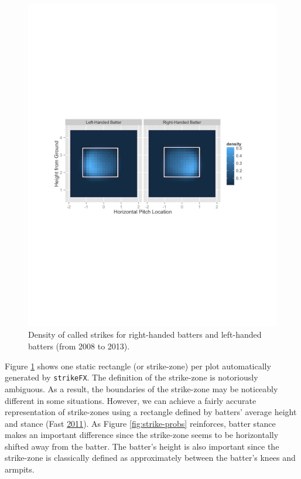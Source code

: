 \documentclass[12pt,]{isuthesis}
\begin{document}
\begin{figure}[htbp]
\centering
\includegraphics{images/strikes.pdf}
\caption{\label{fig:STRIKES}Density of called strikes for right-handed
batters and left-handed batters (from 2008 to 2013).}
\end{figure}

Figure \ref{fig:STRIKES} shows one static rectangle (or strike-zone) per
plot automatically generated by \texttt{strikeFX}. The definition of the
strike-zone is notoriously ambiguous. As a result, the boundaries of the
strike-zone may be noticeably different in some situations. However, we
can achieve a fairly accurate representation of strike-zones using a
rectangle defined by batters' average height and stance (Fast
\protect\hyperlink{ref-Strikezones}{2011}). As Figure
\ref{fig:strike-probs} reinforces, batter stance makes an important
difference since the strike-zone seems to be horizontally shifted away
from the batter. The batter's height is also important since the
strike-zone is classically defined as approximately between the batter's
knees and armpits.
\end{document}
